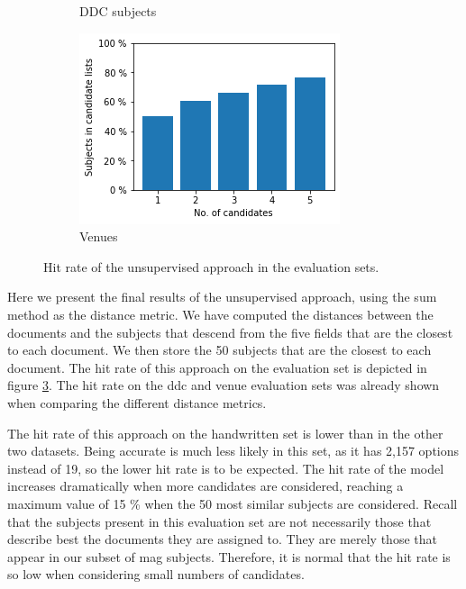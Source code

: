 \begin{figure}
\begin{subfigure}[t]{.32\textwidth}
    \caption{DDC subjects}
    \label{fig:first_ddc}
  \end{subfigure}
   \begin{subfigure}[t]{.32\textwidth}
    \centering
    \includegraphics[width=\textwidth]{figures/unsupervised_approach/results/first_venue.png}
    \caption{Venues}
    \label{fig:first_venue}
  \end{subfigure}
  \caption{Hit rate of the unsupervised approach in the evaluation sets.}
  \label{fig:first_eval}
\end{figure}

Here we present the final results of the unsupervised approach, using the sum method as the distance metric. We have computed the distances between the documents and the subjects that descend from the five fields that are the closest to each document. We then store the 50 subjects that are the closest to each document. The hit rate of this approach on the evaluation set is depicted in figure \ref{fig:first_eval}. The hit rate on the \acrshort{ddc} and venue evaluation sets was already shown when comparing the different distance metrics.

The hit rate of this approach on the handwritten set is lower than in the other two datasets. Being accurate is much less likely in this set, as it has 2,157 options instead of 19, so the lower hit rate is to be expected. The hit rate of the model increases dramatically when more candidates are considered, reaching a maximum value of 15 \% when the 50 most similar subjects are considered. Recall that the subjects present in this evaluation set are not necessarily those that describe best the documents they are assigned to. They are merely those that appear in our subset of \acrshort{mag} subjects. Therefore, it is normal that the hit rate is so low when considering small numbers of candidates.

